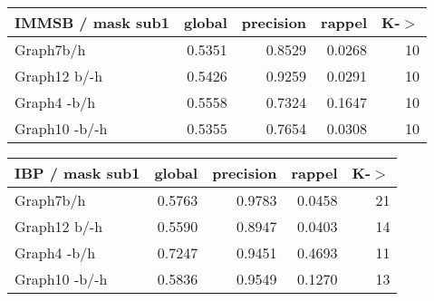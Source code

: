 \begin{table*} 
    \caption{K = 10}
	\begin{minipage}[h]{0.45\linewidth} 
\begin{tabular}{lrrrr}
\hline
 IMMSB / mask sub1   &   global &   precision &   rappel &     K-\ensuremath{>} \\
\hline
 Graph7b/h           &   0.5351 &      0.8529 &   0.0268 & 10 \\
 Graph12 b/-h        &   0.5426 &      0.9259 &   0.0291 & 10 \\
 Graph4 -b/h         &   0.5558 &      0.7324 &   0.1647 & 10 \\
 Graph10 -b/-h       &   0.5355 &      0.7654 &   0.0308 & 10 \\
\hline
\end{tabular}
\end{minipage}
\hspace{0.5cm}
\begin{minipage}[h]{0.45\linewidth}
\begin{tabular}{lrrrr}
\hline
 IBP / mask sub1   &   global &   precision &   rappel &     K-\ensuremath{>} \\
\hline
 Graph7b/h         &   0.5763 &      0.9783 &   0.0458 & 21 \\
 Graph12 b/-h      &   0.5590 &      0.8947 &   0.0403 & 14 \\
 Graph4 -b/h       &   0.7247 &      0.9451 &   0.4693 & 11 \\
 Graph10 -b/-h     &   0.5836 &      0.9549 &   0.1270 & 13 \\
\hline
\end{tabular}
\end{minipage}
\end{table*}


